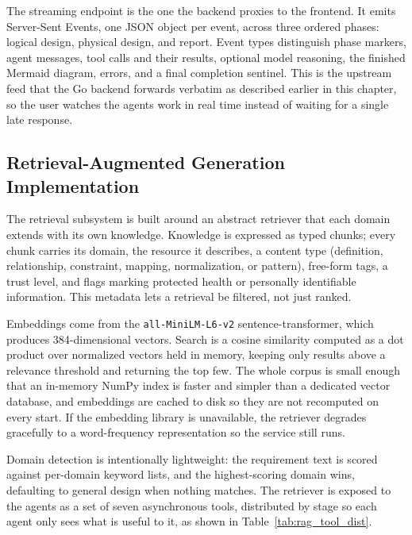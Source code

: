 The streaming endpoint is the one the backend proxies to the frontend. It emits Server-Sent Events, one JSON object per event, across three ordered phases: logical design, physical design, and report. Event types distinguish phase markers, agent messages, tool calls and their results, optional model reasoning, the finished Mermaid diagram, errors, and a final completion sentinel. This is the upstream feed that the Go backend forwards verbatim as described earlier in this chapter, so the user watches the agents work in real time instead of waiting for a single late response.

\subsection{Retrieval-Augmented Generation Implementation}

The retrieval subsystem is built around an abstract retriever that each domain extends with its own knowledge. Knowledge is expressed as typed chunks; every chunk carries its domain, the resource it describes, a content type (definition, relationship, constraint, mapping, normalization, or pattern), free-form tags, a trust level, and flags marking protected health or personally identifiable information. This metadata lets a retrieval be filtered, not just ranked.

Embeddings come from the \texttt{all-MiniLM-L6-v2} sentence-transformer, which produces 384-dimensional vectors. Search is a cosine similarity computed as a dot product over normalized vectors held in memory, keeping only results above a relevance threshold and returning the top few. The whole corpus is small enough that an in-memory NumPy index is faster and simpler than a dedicated vector database, and embeddings are cached to disk so they are not recomputed on every start. If the embedding library is unavailable, the retriever degrades gracefully to a word-frequency representation so the service still runs.

Domain detection is intentionally lightweight: the requirement text is scored against per-domain keyword lists, and the highest-scoring domain wins, defaulting to general design when nothing matches. The retriever is exposed to the agents as a set of seven asynchronous tools, distributed by stage so each agent only sees what is useful to it, as shown in Table~\ref{tab:rag_tool_dist}.

